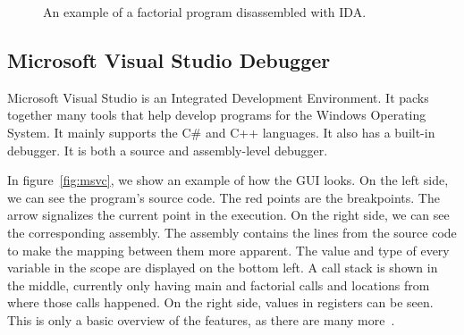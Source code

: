 \begin{figure}
    \caption{An example of a factorial program disassembled with IDA.}
    \label{fig:ida}
\end{figure}

\subsection{Microsoft Visual Studio Debugger}
Microsoft Visual Studio is an Integrated Development Environment. It packs
together many tools that help develop programs for the Windows Operating
System. It mainly supports the C\# and C++ languages. It also has a built-in
debugger. It is both a source and assembly-level debugger.

In figure~\ref{fig:msvc}, we show an example of how the GUI looks. On the left
side, we can see the program's source code. The red points are the breakpoints.
The arrow signalizes the current point in the execution. On the right side, we
can see the corresponding assembly. The assembly contains the lines from the
source code to make the mapping between them more apparent. The value and type
of every variable in the scope are displayed on the bottom left. A call stack
is shown in the middle, currently only having main and factorial calls and
locations from where those calls happened. On the right side, values in
registers can be seen. This is only a basic overview of the features, as there
are many more~\cite{windows-msdn-visual-studio-debugger}.

